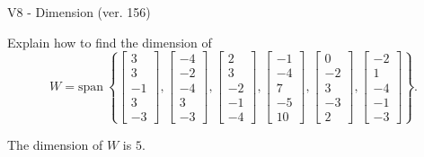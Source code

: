 \begin{exercise}
  \begin{exerciseTitle}V8 - Dimension (ver. 156)\end{exerciseTitle}
  \begin{exerciseStatement}
    Explain how to find the dimension of 
\[W=\mathrm{span}\ \left\{\left[\begin{array}{r}
3 \\
3 \\
-1 \\
3 \\
-3
\end{array}\right] , \left[\begin{array}{r}
-4 \\
-2 \\
-4 \\
3 \\
-3
\end{array}\right] , \left[\begin{array}{r}
2 \\
3 \\
-2 \\
-1 \\
-4
\end{array}\right] , \left[\begin{array}{r}
-1 \\
-4 \\
7 \\
-5 \\
10
\end{array}\right] , \left[\begin{array}{r}
0 \\
-2 \\
3 \\
-3 \\
2
\end{array}\right] , \left[\begin{array}{r}
-2 \\
1 \\
-4 \\
-1 \\
-3
\end{array}\right]\right\}.\]



  \end{exerciseStatement}
  \begin{exerciseAnswer}
   The dimension of \(W\) is  \(5\).
  


  \end{exerciseAnswer}
\end{exercise}
